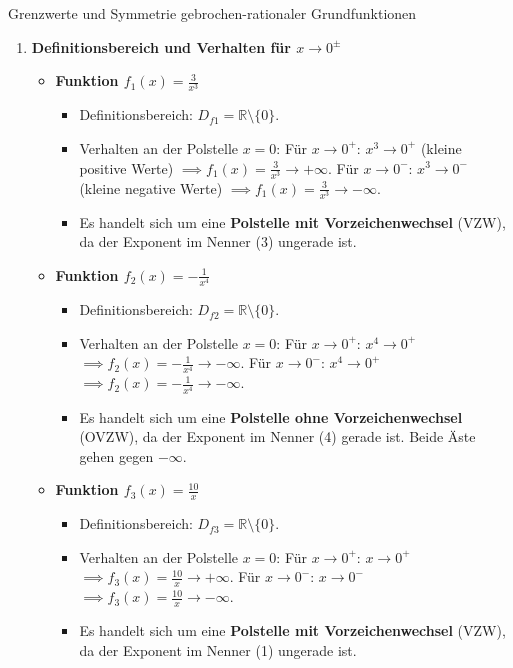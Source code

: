 \begin{loesungsumgebung}{Grenzwerte und Symmetrie gebrochen-rationaler Grundfunktionen}

\begin{enumerate}[label=(\alph*)]
    \item \textbf{Definitionsbereich und Verhalten für $x \to 0^\pm$}
    \begin{itemize}
        \item \textbf{Funktion $f_1(x) = \frac{3}{x^3}$}
        \begin{itemize}
            \item Definitionsbereich: $D_{f1} = \mathbb{R} \setminus \{0\}$.
            \item Verhalten an der Polstelle $x=0$:
            Für $x \to 0^+$: $x^3 \to 0^+$ (kleine positive Werte) $\implies f_1(x) = \frac{3}{x^3} \to +\infty$.
            Für $x \to 0^-$: $x^3 \to 0^-$ (kleine negative Werte) $\implies f_1(x) = \frac{3}{x^3} \to -\infty$.
            \item Es handelt sich um eine \textbf{Polstelle mit Vorzeichenwechsel} (VZW), da der Exponent im Nenner (3) ungerade ist.
        \end{itemize}

        \item \textbf{Funktion $f_2(x) = -\frac{1}{x^4}$}
        \begin{itemize}
            \item Definitionsbereich: $D_{f2} = \mathbb{R} \setminus \{0\}$.
            \item Verhalten an der Polstelle $x=0$:
            Für $x \to 0^+$: $x^4 \to 0^+$ $\implies f_2(x) = -\frac{1}{x^4} \to -\infty$.
            Für $x \to 0^-$: $x^4 \to 0^+$ $\implies f_2(x) = -\frac{1}{x^4} \to -\infty$.
            \item Es handelt sich um eine \textbf{Polstelle ohne Vorzeichenwechsel} (OVZW), da der Exponent im Nenner (4) gerade ist. Beide Äste gehen gegen $-\infty$.
        \end{itemize}

        \item \textbf{Funktion $f_3(x) = \frac{10}{x}$}
        \begin{itemize}
            \item Definitionsbereich: $D_{f3} = \mathbb{R} \setminus \{0\}$.
            \item Verhalten an der Polstelle $x=0$:
            Für $x \to 0^+$: $x \to 0^+$ $\implies f_3(x) = \frac{10}{x} \to +\infty$.
            Für $x \to 0^-$: $x \to 0^-$ $\implies f_3(x) = \frac{10}{x} \to -\infty$.
            \item Es handelt sich um eine \textbf{Polstelle mit Vorzeichenwechsel} (VZW), da der Exponent im Nenner (1) ungerade ist.
        \end{itemize}
    \end{itemize}


\end{enumerate}
\end{loesungsumgebung}
